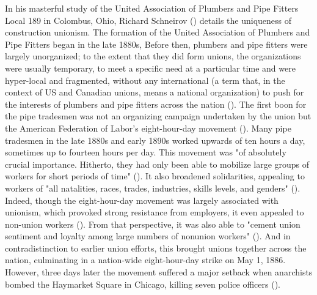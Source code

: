\documentclass[12pt]{article}
\begin{document}
In his masterful study of the United Association of Plumbers and Pipe Fitters Local 189 in Colombus, Ohio, Richard Schneirov (\citeyear{schneirovPrideSolidarityHistory1993}) details the uniqueness of construction unionism. The formation of the United Association of Plumbers and Pipe Fitters began in the late 1880s, Before then, plumbers and pipe fitters were largely unorganized; to the extent that they did form unions, the organizations were usually temporary, to meet a specific need at a particular time and were hyper-local and fragmented, without any international (a term that, in the context of US and Canadian unions, means a national organization) to push for the interests of plumbers and pipe fitters across the nation (\citeyear[58]{schneirovPrideSolidarityHistory1993}). The first boon for the pipe tradesmen was not an organizing campaign undertaken by the union but the American Federation of Labor’s eight-hour-day movement (\citeyear[11, 43–45]{schneirovPrideSolidarityHistory1993}). Many pipe tradesmen in the late 1880s and early 1890s worked upwards of ten hours a day, sometimes up to fourteen hours per day. This movement was "of absolutely crucial importance. Hitherto, they had only been able to mobilize large groups of workers for short periods of time" (\citeyear[43–45]{schneirovPrideSolidarityHistory1993}). It also broadened solidarities, appealing to workers of "all natalities, races, trades, industries, skills levels, and genders" (\citeyear[43]{schneirovPrideSolidarityHistory1993}). Indeed, though the eight-hour-day movement was largely associated with unionism, which provoked strong resistance from employers, it even appealed to non-union workers (\citeyear[45]{schneirovPrideSolidarityHistory1993}). From that perspective, it was also able to "cement union sentiment and loyalty among large numbers of nonunion workers" (\citeyear[45]{schneirovPrideSolidarityHistory1993}). And in contradistinction to earlier union efforts, this brought unions together across the nation, culminating in a nation-wide eight-hour-day strike on May 1, 1886. However, three days later the movement suffered a major setback when anarchists bombed the Haymarket Square in Chicago, killing seven police officers (\citeyear[45]{schneirovPrideSolidarityHistory1993}).
\end{document}
